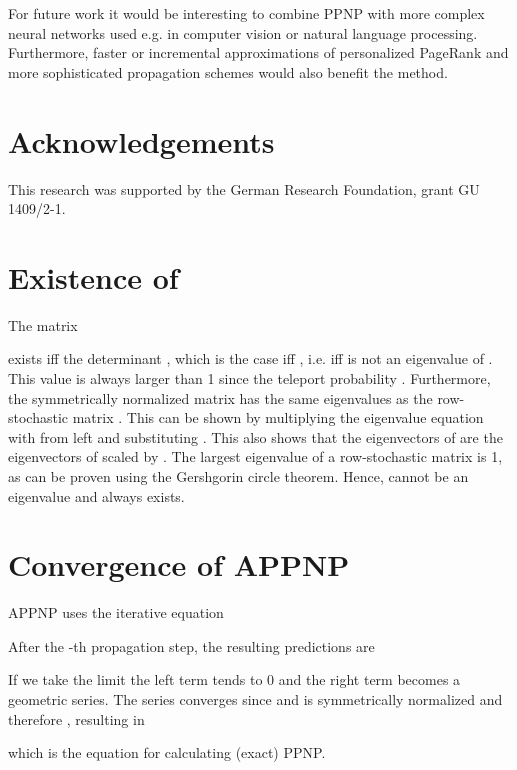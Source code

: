 \documentclass{article} \usepackage{iclr2019_conference,times}
\begin{document}
For future work it would be interesting to combine PPNP with more complex neural networks used e.g. in computer vision or natural language processing. Furthermore, faster or incremental approximations of personalized PageRank \citep{bahmani_fast_2010, bahmani_fast_2011, lofgren_fast-ppr:_2014} and more sophisticated propagation schemes would also benefit the method.

\section*{Acknowledgements}

This research was supported by the German Research Foundation, grant GU 1409/2-1.




\appendix

\section{Existence of } \label{app:inverse}

The matrix


exists iff the determinant , which is the case iff , i.e. iff  is not an eigenvalue of . This value is always larger than 1 since the teleport probability . Furthermore, the symmetrically normalized matrix  has the same eigenvalues as the row-stochastic matrix . This can be shown by multiplying the eigenvalue equation  with  from left and substituting . This also shows that the eigenvectors of  are the eigenvectors of  scaled by . The largest eigenvalue of a row-stochastic matrix is 1, as can be proven using the Gershgorin circle theorem. Hence,  cannot be an eigenvalue and  always exists.

\section{Convergence of APPNP} \label{app:convergence}

APPNP uses the iterative equation


After the -th propagation step, the resulting predictions are


If we take the limit  the left term tends to 0 and the right term becomes a geometric series. The series converges since  and  is symmetrically normalized and therefore , resulting in

which is the equation for calculating (exact) PPNP.
\end{document}
